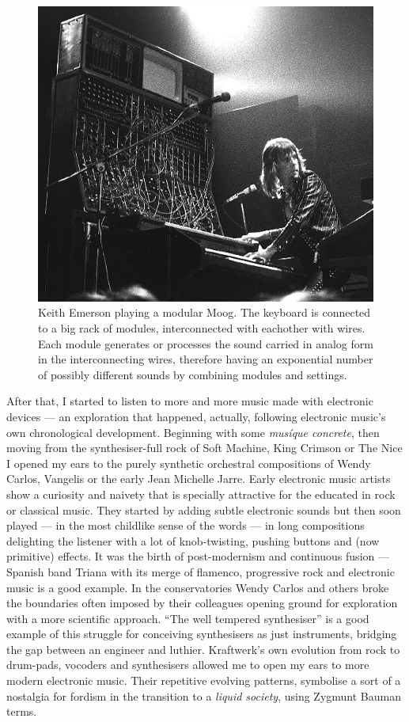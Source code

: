 \begin{figure}[h!]
  \centering
  \includegraphics[width=.7\textwidth]{pic/elpmoog.jpg}
  \caption[Keith Emerson playing a modular Moog]{Keith Emerson playing
    a modular Moog. The keyboard is connected to a big rack of
    modules, interconnected with eachother with wires. Each module
    generates or processes the sound carried in analog form in the
    interconnecting wires, therefore having an exponential number of
    possibly different sounds by combining modules and settings.}
\end{figure}

After that, I started to listen to more and more music made with
electronic devices --- an exploration that happened, actually,
following electronic music's own chronological development. Beginning
with some \emph{musíque concrete}, then moving
from the synthesiser-full rock of Soft Machine, King Crimson or The
Nice I opened my ears to the purely synthetic orchestral compositions
of Wendy Carlos, Vangelis or the early Jean Michelle Jarre. Early
electronic music artists show a curiosity and naivety that is
specially attractive for the educated in rock or classical music. They
started by adding subtle electronic sounds but then soon played --- in
the most childlike sense of the words --- in long compositions
delighting the listener with a lot of knob-twisting, pushing buttons
and (now primitive) effects. It was the birth of post-modernism and
continuous fusion --- Spanish band Triana with its merge of flamenco,
progressive rock and electronic music is a good example. In the
conservatories Wendy Carlos and others broke the boundaries often
imposed by their colleagues opening ground for exploration with a more
scientific approach. ``The well tempered synthesiser'' is a good
example of this struggle for conceiving synthesisers as just
instruments, bridging the gap between an engineer and
luthier. Kraftwerk's own evolution from rock to drum-pads, vocoders
and synthesisers allowed me to open my ears to more modern electronic
music. Their repetitive evolving patterns, symbolise a sort of a
nostalgia for fordism in the transition to a \emph{liquid society},
using Zygmunt Bauman terms.


